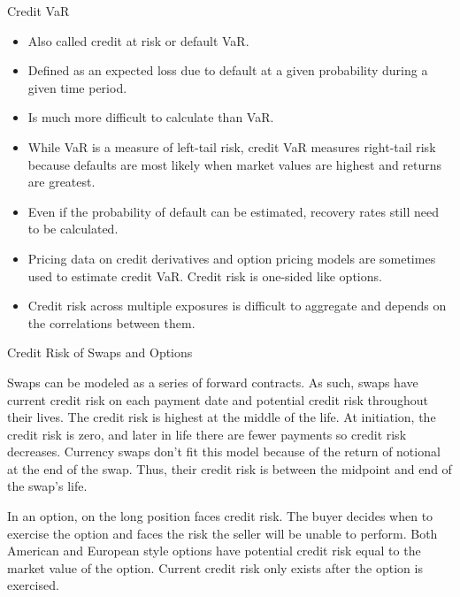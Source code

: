 \documentclass[../custom]{flashcards}
\newcommand{\studyArea}{Risk Management}
\begin{document}
\begin{flashcard}[\studyArea]{Credit VaR}
    \begin{itemize}
        \item Also called credit at risk or default VaR.
        \item Defined as an expected loss due to default at a given probability during a given time period.
        \item Is much more difficult to calculate than VaR.
        \item While VaR is a measure of left-tail risk, credit VaR measures right-tail risk because defaults are most likely when market values are highest and returns are greatest.
        \item Even if the probability of default can be estimated, recovery rates still need to be calculated.
        \item Pricing data on credit derivatives and option pricing models are sometimes used to estimate credit VaR. Credit risk is one-sided like options.
        \item Credit risk across multiple exposures is difficult to aggregate and depends on the correlations between them.
    \end{itemize}
\end{flashcard}

\begin{flashcard}[\studyArea]{Credit Risk of Swaps and Options}
    \begin{flushleft}
        Swaps can be modeled as a series of forward contracts. As such, swaps have current credit risk on each payment date and potential credit risk throughout their lives. The credit risk is highest at the middle of the life. At initiation, the credit risk is zero, and later in life there are fewer payments so credit risk decreases. Currency swaps don't fit this model because of the return of notional at the end of the swap. Thus, their credit risk is between the midpoint and end of the swap's life.\newline

        In an option, on the long position faces credit risk. The buyer decides when to exercise the option and faces the risk the seller will be unable to perform. Both American and European style options have potential credit risk equal to the market value of the option. Current credit risk only exists after the option is exercised.
    \end{flushleft}
\end{flashcard}
\end{document}
